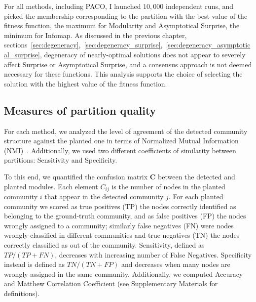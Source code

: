 For all methods, including PACO, I launched $10,000$ independent runs, and picked the membership corresponding to the partition with the best value of the fitness function, the maximum for Modularity and Asymptotical Surprise, the minimum for Infomap.
As discussed in the previous chapter, sections~\ref{sec:degeneracy},~\ref{sec:degeneracy_surprise},~\ref{sec:degeneracy_asymptotical_surprise}, degeneracy of nearly-optimal solutions does not appear to severely affect Surprise or Asymptotical Surprise, and a consensus approach is not deemed necessary for these functions.
This analysis supports the choice of selecting the solution with the highest value of the fitness function.

\subsection{Measures of partition quality}
For each method, we analyzed the level of agreement of the detected community structure against the planted one in terms of Normalized Mutual Information (NMI)~\cite{danon2005}.
Additionally, we used two different coefficients of similarity between partitions: Sensitivity and Specificity. 

To this end, we quantified the confusion matrix $\mathbf{C}$ between the detected and planted modules. Each element $C_{ij}$ is the number of nodes in the planted community $i$ that appear in the detected community $j$.
For each planted community we scored as true positives (TP) the nodes correctly identified as belonging to the ground-truth community, and as false positives (FP) the nodes wrongly assigned to a community; similarly false negatives (FN) were nodes wrongly classified in different communities and true negatives (TN) the nodes correctly classified as out of the community.
Sensitivity, defined as $TP/(TP+FN)$, decreases with increasing number of False Negatives. Specificity instead is defined as $TN/(TN+FP)$ and decreases when many nodes are wrongly assigned in the same community.
Additionally, we computed Accuracy and Matthew Correlation Coefficient (see Supplementary Materials for definitions).

